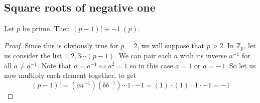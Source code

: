 \subsection{Square roots of negative one}
\begin{theorem}
	Let \(p\) be prime.
	Then \((p-1)!
	\equiv -1\ (p)\).
\end{theorem}
\begin{proof}
	Since this is obviously true for \(p=2\), we will suppose that \(p>2\).
	In \(\mathbb Z_p\), let us consider the list \(1, 2, 3 \cdots (p-1)\).
	We can pair each \(a\) with its inverse \(a^{-1}\) for all \(a \neq a^{-1}\).
	Note that \(a = a^{-1} \iff a^2 = 1\) so in this case \(a=1\) or \(a=-1\).
	So let us now multiply each element together, to get
	\[
		(p-1)!
		= (aa^{-1}) (bb^{-1}) \cdots 1 \cdot -1 = (1) \cdot (1) \cdots 1 \cdot -1 = -1
	\]
\end{proof}

